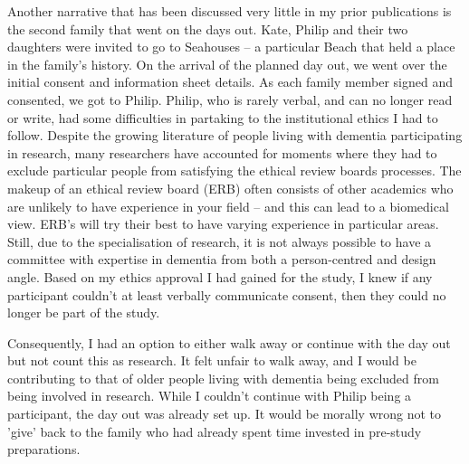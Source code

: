 Another narrative that has been discussed very little in my prior publications is the second family that went on the days out. Kate, Philip and their two daughters were invited to go to Seahouses – a particular Beach that held a place in the family's history. On the arrival of the planned day out, we went over the initial consent and information sheet details. As each family member signed and consented, we got to Philip. Philip, who is rarely verbal, and can no longer read or write, had some difficulties in partaking to the institutional ethics I had to follow. Despite the growing literature of people living with dementia participating in research, many researchers have accounted for moments where they had to exclude particular people from satisfying the ethical review boards processes. The makeup of an ethical review board (ERB) often consists of other academics who are unlikely to have experience in your field – and this can lead to a biomedical view. ERB's will try their best to have varying experience in particular areas. Still, due to the specialisation of research, it is not always possible to have a committee with expertise in dementia from both a person-centred and design angle. Based on my ethics approval I had gained for the study, I knew if any participant couldn't at least verbally communicate consent, then they could no longer be part of the study.

Consequently, I had an option to either walk away or continue with the day out but not count this as research. It felt unfair to walk away, and I would be contributing to that of older people living with dementia being excluded from being involved in research. While I couldn't continue with Philip being a participant, the day out was already set up. It would be morally wrong not to 'give' back to the family who had already spent time invested in pre-study preparations.

